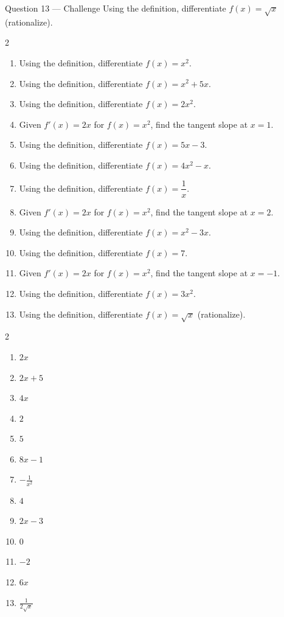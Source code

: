 \documentclass[11pt]{article}
\begin{document}
\begin{qbox}{Question 13 --- Challenge}
Using the definition, differentiate $f(x)=\sqrt{x}$ (rationalize).\workspace{3.5cm}
\end{qbox}

\clearpage
{}

\begin{recapbox}
\begin{multicols}{2}
\small
\begin{enumerate}[leftmargin=*,itemsep=3pt]
  \item Using the definition, differentiate $f(x)=x^2$.
  \item Using the definition, differentiate $f(x)=x^2+5x$.
  \item Using the definition, differentiate $f(x)=2x^2$.
  \item Given $f'(x)=2x$ for $f(x)=x^2$, find the tangent slope at $x=1$.
  \item Using the definition, differentiate $f(x)=5x-3$.
  \item Using the definition, differentiate $f(x)=4x^2-x$.
  \item Using the definition, differentiate $f(x)=\dfrac1x$.
  \item Given $f'(x)=2x$ for $f(x)=x^2$, find the tangent slope at $x=2$.
  \item Using the definition, differentiate $f(x)=x^2-3x$.
  \item Using the definition, differentiate $f(x)=7$.
  \item Given $f'(x)=2x$ for $f(x)=x^2$, find the tangent slope at $x=-1$.
  \item Using the definition, differentiate $f(x)=3x^2$.
  \item Using the definition, differentiate $f(x)=\sqrt{x}$ (rationalize).
\end{enumerate}
\end{multicols}
\end{recapbox}

\begin{keybox}
\begin{multicols}{2}
\small
\begin{enumerate}[leftmargin=*,itemsep=3pt]
  \item $2x$
  \item $2x+5$
  \item $4x$
  \item $2$
  \item $5$
  \item $8x-1$
  \item $-\tfrac1{x^2}$
  \item $4$
  \item $2x-3$
  \item $0$
  \item $-2$
  \item $6x$
  \item $\tfrac1{2\sqrt{x}}$
\end{enumerate}
\end{multicols}
\end{keybox}
\end{document}
